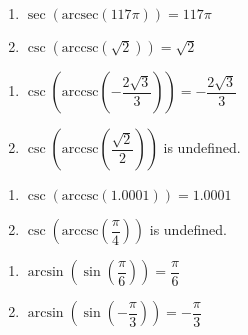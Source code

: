 \documentclass{ximera}
\begin{document}
\begin{multicols}{2}

\begin{enumerate}

\setcounter{enumi}{\value{HW}}

\item $\sec\left(\text{arcsec}\left( 117\pi \right)\right)= 117\pi $
\item $\csc\left(\text{arccsc}\left(\sqrt{2}\right)\right) = \sqrt{2}$ 

\setcounter{HW}{\value{enumi}}

\end{enumerate}

\end{multicols}

\begin{multicols}{2}

\begin{enumerate}

\setcounter{enumi}{\value{HW}}

\item $\csc\left(\text{arccsc}\left(-\dfrac{2\sqrt{3}}{3}\right)\right) = -\dfrac{2\sqrt{3}}{3}$
\item $\csc\left(\text{arccsc}\left(\dfrac{\sqrt{2}}{2}\right)\right)$ is undefined.

\setcounter{HW}{\value{enumi}}

\end{enumerate}

\end{multicols}

\begin{multicols}{2}

\begin{enumerate}

\setcounter{enumi}{\value{HW}}

\item $\csc\left(\text{arccsc}\left(1.0001\right)\right) = 1.0001$ 
\item $\csc\left(\text{arccsc}\left( \dfrac{\pi}{4} \right)\right)$ is undefined.

\setcounter{HW}{\value{enumi}}

\end{enumerate}

\end{multicols}

\begin{multicols}{2}

\begin{enumerate}

\setcounter{enumi}{\value{HW}}

\item  $\arcsin\left(\sin\left(\dfrac{\pi}{6}\right) \right) = \dfrac{\pi}{6}$
\item  $\arcsin\left(\sin\left(-\dfrac{\pi}{3}\right) \right) = -\dfrac{\pi}{3}$

\setcounter{HW}{\value{enumi}}

\end{enumerate}

\end{multicols}
\end{document}
